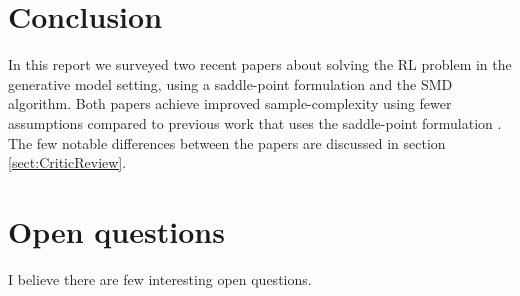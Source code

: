 \documentclass{article}
\newcommand{\ra}[1]{\textcolor{blue}{\{Ron: #1\}}}
\begin{document}
\section{Conclusion}
In this report we surveyed two recent papers about solving the RL problem in the generative model setting, using a saddle-point formulation and the SMD algorithm.
Both papers achieve improved sample-complexity using fewer assumptions compared to previous work that uses the saddle-point formulation \citep{wang2017randomized}.
The few notable differences between the papers are discussed in section \ref{sect:CriticReview}.

\section{Open questions}

I believe there are few interesting open questions.
\end{document}

